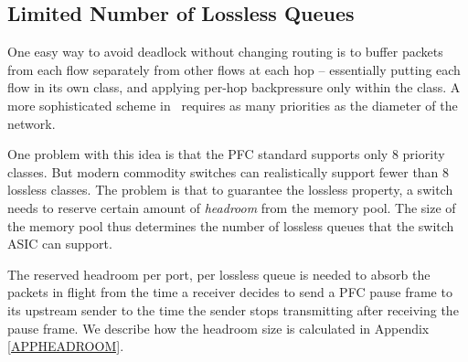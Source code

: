

\subsection{Limited Number of Lossless Queues}
\label{subsec:pfcheadroom}

One easy way to avoid deadlock without changing routing is to buffer packets
from each flow separately from other flows at each hop -- essentially putting
each flow in its own class, and applying per-hop backpressure only within the
class.  A more sophisticated scheme in~\cite{karol2003prevention} requires as
many priorities as the diameter of the network. 

One problem with this idea is that the PFC standard supports only 8 priority
classes. But modern commodity switches can realistically support fewer than 8
lossless classes.  The problem is that  to guarantee the lossless property, a
switch needs to reserve certain amount of {\it headroom} from the memory pool.
The size of the memory pool thus determines the number of lossless queues that
the switch ASIC can support.

The reserved headroom per port, per lossless queue is needed to absorb the
packets in flight from the time a receiver decides to send a PFC pause frame to
its upstream sender to the time the sender stops transmitting after receiving
the pause frame. We describe how the
headroom size is calculated in Appendix \ref{APPHEADROOM}.

